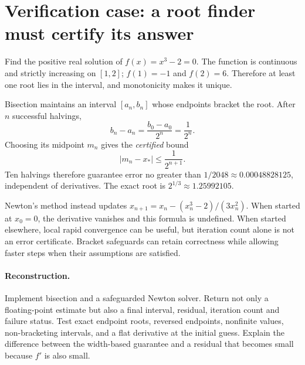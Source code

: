 \clearpage
\section*{Verification case: a root finder must certify its answer}
\noindent Find the positive real solution of \(f(x)=x^3-2=0\).
The function is continuous and strictly increasing on \([1,2]\);
\(f(1)=-1\) and \(f(2)=6\). Therefore at least one root lies in
the interval, and monotonicity makes it unique.

Bisection maintains an interval \([a_n,b_n]\) whose endpoints
bracket the root. After \(n\) successful halvings,
\[
b_n-a_n=\frac{b_0-a_0}{2^n}=\frac1{2^n}.
\]
Choosing its midpoint \(m_n\) gives the \emph{certified} bound
\[
|m_n-x_*|\le\frac1{2^{n+1}}.
\]
Ten halvings therefore guarantee error no greater than
\(1/2048\approx0.00048828125\), independent of derivatives.
The exact root is \(2^{1/3}\approx1.25992105\).

Newton's method instead updates
\(x_{n+1}=x_n-(x_n^3-2)/(3x_n^2)\).
When started at \(x_0=0\), the derivative vanishes and this
formula is undefined. When started elsewhere, local rapid
convergence can be useful, but iteration count alone is not an
error certificate. Bracket safeguards can retain correctness while
allowing faster steps when their assumptions are satisfied.

\paragraph{Reconstruction.}
Implement bisection and a safeguarded Newton solver.
Return not only a floating-point estimate but also a final interval,
residual, iteration count and failure status.
Test exact endpoint roots, reversed endpoints, nonfinite values,
non-bracketing intervals, and a flat derivative at the initial guess.
Explain the difference between the width-based guarantee and a
residual that becomes small because \(f'\) is also small.
